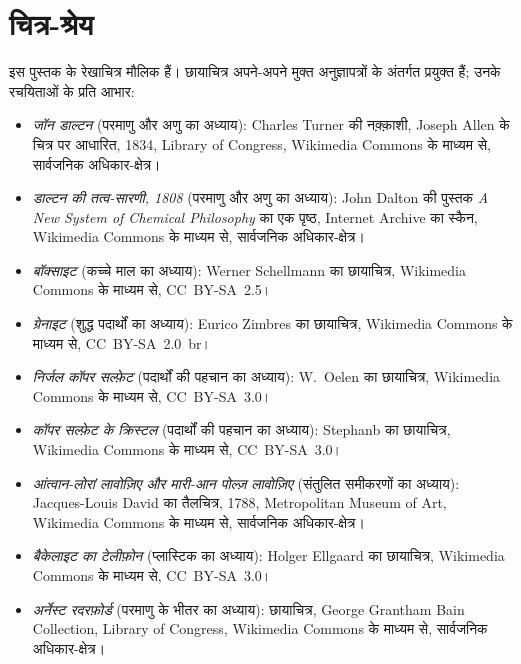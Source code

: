 \chapter*{चित्र-श्रेय}

इस पुस्तक के रेखाचित्र मौलिक हैं। छायाचित्र अपने-अपने मुक्त अनुज्ञापत्रों के
अंतर्गत प्रयुक्त हैं; उनके रचयिताओं के प्रति आभार:

\begin{itemize}
  \item \emph{जॉन डाल्टन} (परमाणु और अणु का अध्याय): Charles Turner की
        नक़्क़ाशी, Joseph Allen के चित्र पर आधारित, 1834, Library of Congress,
        Wikimedia Commons के माध्यम से, सार्वजनिक अधिकार-क्षेत्र।
  \item \emph{डाल्टन की तत्व-सारणी, 1808} (परमाणु और अणु का अध्याय):
        John Dalton की पुस्तक \emph{A New System of Chemical Philosophy} का
        एक पृष्ठ, Internet Archive का स्कैन, Wikimedia Commons के माध्यम से,
        सार्वजनिक अधिकार-क्षेत्र।
  \item \emph{बॉक्साइट} (कच्चे माल का अध्याय): Werner Schellmann का
        छायाचित्र, Wikimedia Commons के माध्यम से, CC~BY-SA~2.5।
  \item \emph{ग्रेनाइट} (शुद्ध पदार्थों का अध्याय): Eurico Zimbres का
        छायाचित्र, Wikimedia Commons के माध्यम से, CC~BY-SA~2.0~br।
  \item \emph{निर्जल कॉपर सल्फ़ेट} (पदार्थों की पहचान का अध्याय): W.~Oelen का
        छायाचित्र, Wikimedia Commons के माध्यम से, CC~BY-SA~3.0।
  \item \emph{कॉपर सल्फ़ेट के क्रिस्टल} (पदार्थों की पहचान का अध्याय):
        Stephanb का छायाचित्र, Wikimedia Commons के माध्यम से, CC~BY-SA~3.0।
  \item \emph{आंत्वान-लोरां लावोज़िए और मारी-आन पोल्ज़ लावोज़िए}
        (संतुलित समीकरणों का अध्याय): Jacques-Louis David का तैलचित्र, 1788,
        Metropolitan Museum of Art, Wikimedia Commons के माध्यम से, सार्वजनिक
        अधिकार-क्षेत्र।
  \item \emph{बैकेलाइट का टेलीफ़ोन} (प्लास्टिक का अध्याय): Holger Ellgaard का
        छायाचित्र, Wikimedia Commons के माध्यम से, CC~BY-SA~3.0।
  \item \emph{अर्नेस्ट रदरफ़ोर्ड} (परमाणु के भीतर का अध्याय): छायाचित्र,
        George Grantham Bain Collection, Library of Congress, Wikimedia
        Commons के माध्यम से, सार्वजनिक अधिकार-क्षेत्र।

\end{itemize}
